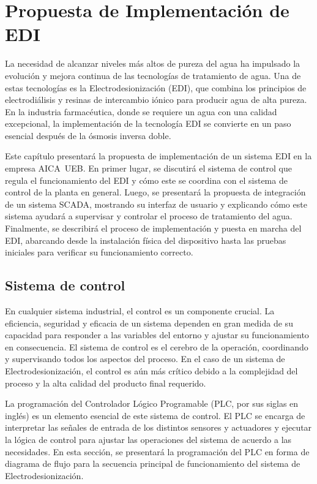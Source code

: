 \chapter{Propuesta de Implementación de EDI}
\label{cap:propuesta_implementacion}
La necesidad de alcanzar niveles más altos de pureza del agua ha impulsado
la evolución y mejora continua de las tecnologías de tratamiento de agua.
Una de estas tecnologías es la Electrodesionización (EDI), que combina
los principios de electrodiálisis y resinas de intercambio iónico para
producir agua de alta pureza. En la industria farmacéutica, donde se
requiere un agua con una calidad excepcional, la implementación de la
tecnología EDI se convierte en un paso esencial después de la ósmosis inversa doble.

Este capítulo presentará la propuesta de implementación de un sistema
EDI en la empresa AICA UEB. En primer lugar, se discutirá el sistema de
control que regula el funcionamiento del EDI y cómo este se coordina
con el sistema de control de la planta en general.
Luego, se presentará la propuesta de integración de un sistema SCADA,
mostrando su interfaz de usuario y explicando cómo este sistema
ayudará a supervisar y controlar el proceso de tratamiento del agua.
Finalmente, se describirá el proceso de implementación y puesta en marcha del
EDI, abarcando desde la instalación física del dispositivo hasta las pruebas
iniciales para verificar su funcionamiento correcto.
\section{Sistema de control}
\label{sec:sistema_control}
En cualquier sistema industrial, el control es un componente crucial. La eficiencia, seguridad y eficacia de un sistema dependen en gran medida de su capacidad para responder a las variables del entorno y ajustar su funcionamiento en consecuencia. El sistema de control es el cerebro de la operación, coordinando y supervisando todos los aspectos del proceso. En el caso de un sistema de Electrodesionización, el control es aún más crítico debido a la complejidad del proceso y la alta calidad del producto final requerido.

La programación del Controlador Lógico Programable (PLC, por sus siglas en inglés) es un elemento esencial de este sistema de control. El PLC se encarga de interpretar las señales de entrada de los distintos sensores y actuadores y ejecutar la lógica de control para ajustar las operaciones del sistema de acuerdo a las necesidades. En esta sección, se presentará la programación del PLC en forma de diagrama de flujo para la secuencia principal de funcionamiento del sistema de Electrodesionización.
